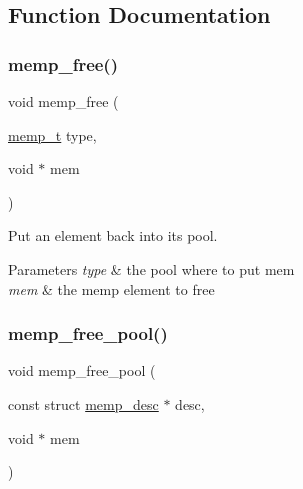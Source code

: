 \subsection{Function Documentation}
\mbox{\label{openmote-cc2538_2lwip_2src_2core_2memp_8c_aecd94926b7c2a0e23ae195f4ae97581f}} 
\subsubsection{\texorpdfstring{memp\+\_\+free()}{memp\_free()}}
{\footnotesize\ttfamily void memp\+\_\+free (\begin{DoxyParamCaption}\item[{\hyperlink{native_2lwip_2src_2include_2lwip_2memp_8h_a85a164b1f7764951cc685ea525114e57}{memp\+\_\+t}}]{type,  }\item[{void $\ast$}]{mem }\end{DoxyParamCaption})}

Put an element back into its pool.


\begin{DoxyParams}{Parameters}
{\em type} & the pool where to put mem \\
\hline
{\em mem} & the memp element to free \\
\hline
\end{DoxyParams}
\mbox{\label{openmote-cc2538_2lwip_2src_2core_2memp_8c_a62f8c3c907743e34eee3cdac7fa1eaa5}} 
\subsubsection{\texorpdfstring{memp\+\_\+free\+\_\+pool()}{memp\_free\_pool()}}
{\footnotesize\ttfamily void memp\+\_\+free\+\_\+pool (\begin{DoxyParamCaption}\item[{const struct \hyperlink{structmemp__desc}{memp\+\_\+desc} $\ast$}]{desc,  }\item[{void $\ast$}]{mem }\end{DoxyParamCaption})}


